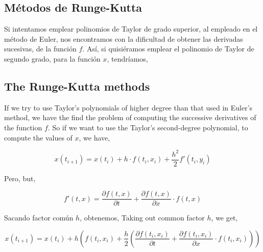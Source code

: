 \begin{paracol}{2}

\subsection{Métodos de Runge-Kutta} 
Si intentamos emplear polinomios de Taylor de grado superior, al empleado en el método de Euler, nos encontramos con la dificultad de obtener las derivadas sucesivas, de la función $f$. Así, si quisiéramos emplear el polinomio de Taylor de segundo grado, para la función $x$, tendríamos,

\switchcolumn
\subsection{The Runge-Kutta methods}
If we try to use Taylor's polynomials of higher degree than that used in Euler's method, we have the find the problem of computing the successive derivatives of the function $f$. So if we want to use the Taylor's second-degree polynomial, to compute the values of $x$, we have,   
\end{paracol}  
\begin{equation*}
x(t_{i+1})=x(t_i)+h\cdot f(t_i,x_i)+\frac{h^2}{2}f'(t_i,y_i)
\end{equation*}
\begin{paracol}{2}
Pero,
\switchcolumn
but,
\end{paracol}
\begin{equation*}
f'(t,x)=\frac{\partial f(t,x)}{\partial t}+\frac{\partial f(t,x)}{\partial x}\cdot f(t,x)
\end{equation*}
\begin{paracol}{2}
Sacando factor común $h$, obtenemos,
\switchcolumn
Taking out common factor $h$, we get,
\end{paracol}
\begin{equation*}
x(t_{i+1})=x(t_i)+h\left(f(t_i,x_i)+\frac{h}{2}\left(\frac{\partial f(t_i,x_i)}{\partial t}+\frac{\partial f(t_i,x_i)}{\partial x}\cdot f(t_i,x_i)\right)\right)
\end{equation*}
